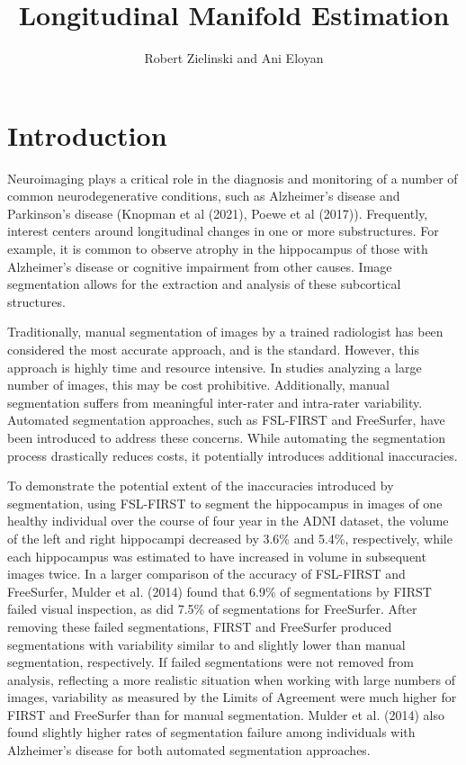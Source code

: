 \documentclass[11pt,reqno]{article}
\begin{document}
\title{Longitudinal Manifold Estimation}
\author[1]{Robert Zielinski and Ani Eloyan}


\maketitle

\section{Introduction}

Neuroimaging plays a critical role in the diagnosis and monitoring of a number of common neurodegenerative conditions, such as Alzheimer's disease and Parkinson's disease (Knopman et al (2021), Poewe et al (2017)). Frequently, interest centers around longitudinal changes in one or more substructures. For example, it is common to observe atrophy in the hippocampus of those with Alzheimer's disease or cognitive impairment from other causes. Image segmentation allows for the extraction and analysis of these subcortical structures.

Traditionally, manual segmentation of images by a trained radiologist has been considered the most accurate approach, and is the standard. However, this approach is highly time and resource intensive. In studies analyzing a large number of images, this may be cost prohibitive. Additionally, manual segmentation suffers from meaningful inter-rater and intra-rater variability. Automated segmentation approaches, such as FSL-FIRST and FreeSurfer, have been introduced to address these concerns. While automating the segmentation process drastically reduces costs, it potentially introduces additional inaccuracies. 

To demonstrate the potential extent of the inaccuracies introduced by segmentation, using FSL-FIRST to segment the hippocampus in images of one healthy individual over the course of four year in the ADNI dataset, the volume of the left and right hippocampi decreased by 3.6\% and 5.4\%, respectively, while each hippocampus was estimated to have increased in volume in subsequent images twice. In a larger comparison of the accuracy of FSL-FIRST and FreeSurfer, Mulder et al. (2014) found that 6.9\% of segmentations by FIRST failed visual inspection, as did 7.5\% of segmentations for FreeSurfer. After removing these failed segmentations, FIRST and FreeSurfer produced segmentations with variability similar to and slightly lower than manual segmentation, respectively. If failed segmentations were not removed from analysis, reflecting a more realistic situation when working with large numbers of images, variability as measured by the Limits of Agreement were much higher for FIRST and FreeSurfer than for manual segmentation. Mulder et al. (2014) also found slightly higher rates of segmentation failure among individuals with Alzheimer's disease for both automated segmentation approaches.
\end{document}
